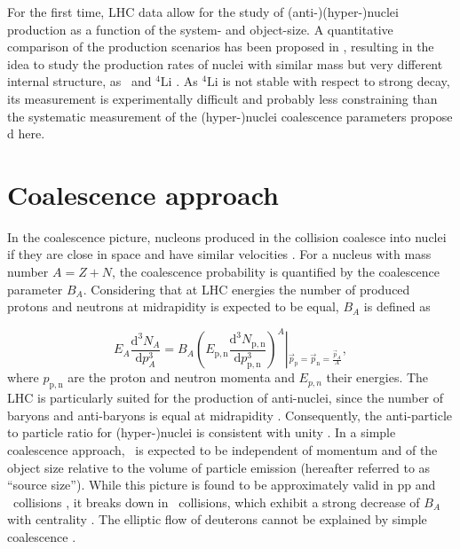 \documentclass[%
 reprint,
 amsmath,amssymb,
 aps,
]{revtex4-1}
\begin{document}
\indent For the first time, LHC data allow for the study of \mbox{(anti-)(hyper-)nuclei} production as a function of the system- and object-size. 
A quantitative comparison of the production scenarios has been proposed in \cite{Mrowczynski:2016xqm}, resulting in the idea  to study the production rates of nuclei with similar mass but very different internal structure, as \hefour~and ${}^{4}\mathrm{Li}$ \cite{Bazak:2018hgl}. 
As ${}^{4}\mathrm{Li}$ is not stable with respect to strong decay, its measurement is experimentally difficult and probably less constraining than the systematic measurement of the (hyper-)nuclei coalescence parameters propose d here.

 
\section{Coalescence approach} \label{sec:coalescence}
In the coalescence picture, nucleons produced in the collision coalesce into nuclei if they are close in space and have similar velocities \cite{Butler:1963,Kapusta:1980}. 
For a nucleus with mass number $A = Z + N$, the coalescence probability is quantified by the coalescence parameter $B_{A}$.
Considering that at LHC energies the number of produced protons and neutrons at midrapidity is expected to be equal,  $B_{A}$ is defined as

\begin{equation}
E_{A}\frac{\mathrm{d}^{3}N_{A}}{\mathrm{d}p_{A}^{3}}=B_{A}{\left(E_{\mathrm{p,n}}\frac{\mathrm{d}^{3}N_{\mathrm{p,n}}}{\mathrm{d}p_{\mathrm{p,n}}^{3}}\right)^{A}}\left\vert_{\vec{p}_{\mathrm{p}}=\vec{p}_{\mathrm{n}}=\frac{\vec{p}_{A}}{A}} \right.,
\label{eq:BA}
\end{equation}
%
where $p_{\mathrm{p,n}}$ are the proton and neutron momenta and $E_{p,n}$ their energies.
%
The LHC is particularly suited for the production of anti-nuclei, since the number of baryons and anti-baryons is equal at midrapidity \cite{Abbas:2013rua}. Consequently, the anti-particle to particle ratio for \mbox{(hyper-)nuclei} is consistent with unity \cite{ALICE:nucleipp2017, Acharya:2019rgc, anielski-HQ14, Acharya:2017dmc, Adam:2015yta}.
In a simple coalescence approach, \bA~is expected to be independent of momentum and of the object size relative to the volume of particle emission (hereafter referred to as ``source size'').
While this picture is found to be approximately valid in pp and \pPb~collisions \cite{ALICE:nucleipp2017, Acharya:2019rgc, anielski-HQ14}, it breaks down in \PbPb~collisions, which exhibit a strong decrease of $B_{A}$ with centrality \cite{ALICE:deuteronppPbPb2015}. 
The elliptic flow of deuterons cannot be explained by simple coalescence \cite{Acharya:2017dmc}. 
\end{document}
